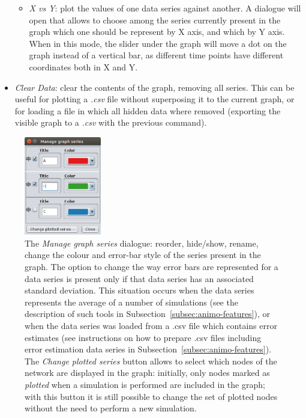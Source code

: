 \documentclass{article}
\begin{document}
\begin{itemize}
\begin{itemize}
	\item \emph{X vs Y}: plot the values of one data series against another. A dialogue will open that allows to
	      choose among the series currently present in the graph which one should be represent by X axis, and which
	      by Y axis. When in this mode, the slider under the graph will move a dot on the graph instead of a vertical bar,
	      as different time points have different coordinates both in X and Y.
    \end{itemize}
  \item \emph{Clear Data}: clear the contents of the graph, removing all series. This can be useful for plotting
a \emph{.csv} file without superposing it to the current graph, or for loading a file in which all hidden data where removed
(exporting the visible graph to a \emph{.csv} with the previous command).
\end{itemize}

\begin{figure}[htb]
\begin{center}
\includegraphics[width=0.3\textwidth]{images/manage_data_series_dialog}
\end{center}
\caption{The \emph{Manage graph series} dialogue: reorder, hide/show, rename, change the colour and error-bar style
of the series present in the graph. The option to change the way error bars are represented for a data series is present only if that
data series has an associated standard deviation. This situation occurs when the data series represents the average of a number of simulations 
(see the description of such tools in Subsection~\ref{subsec:animo-features}), or when the data series was loaded from a .csv file
which contains error estimates (see instructions on how to prepare .csv files including error estimation data series in Subsection~\ref{subsec:animo-features}).
The \emph{Change plotted series} button allows to select which nodes of the network
are displayed in the graph: initially, only nodes marked as \emph{plotted} when a simulation is performed are included
in the graph; with this button it is still possible to
change the set of plotted nodes without the need to perform a new simulation.\label{fig:manage-data-series}}
\end{figure}
\end{document}
